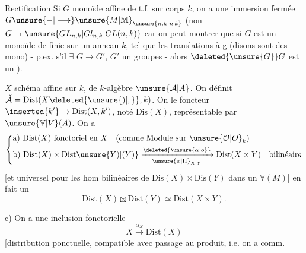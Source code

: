 \uline{Rectification} \quad Si $G$ monoïde affine de t.f. sur corps $k$, on a une immersion fermée  $G\unsure{\mathbin{-}|\longrightarrow}\unsure{M|\mathbb M}_{\unsure{n,k|n\,k}}$ (non $G\to\unsure{GL_{n,k}|Gl_{n,k}|GL(n,k)}$\unsure{)} car on peut montrer que si $G$ est un monoïde de  finie sur un anneau $k$, tel que les translations à g (disons sont des mono) - p.ex. s'il $\exists$  $G\longrightarrow G'$, $G'$ un  groupes - alors $\deleted{\unsure{G}}G$ est un ).


 $X$ schéma affine sur $k$,  de $k$-algèbre $\unsure{\mathcal A|A}$. On définit $\check{\mathcal A}=\mathrm{Dist}(X\deleted{\unsure{)|,}},k)$. On  le foncteur $\inserted{k'}\rightarrow\mathrm{Dist}(X,k')$, noté $\mathrm{Dis}(X)$, représentable par $\unsure{\mathbb V|V}(A)$. On a
\reversemarginpar{}\normalmarginpar
\[
\left\{\begin{aligned}
&\text{a)}\ \mathrm{Dist}(X)\ \text{fonctoriel en }X\quad
  (\text{comme Module sur }\unsure{\mathcal O|O}_k)\\
&\text{b)}\ \mathrm{Dist}(X)\times\mathrm{Dist}\unsure{Y)|(Y)}
  \xrightarrow[\unsure{\pi|\Pi}_{X,Y}]{\deleted{\unsure{\alpha|o}}}
  \mathrm{Dist}(X\times Y)\quad\text{bilinéaire}
\end{aligned}\right.
\]
[et universel pour les hom bilinéaires de $\mathrm{Dis}(X)\times\mathrm{Dis}(Y)$ dans un $\mathbb V(M)$]  en fait un 
\[
\mathrm{Dist}(X)\boxtimes\mathrm{Dist}(Y)\simeq\mathrm{Dist}(X\times Y).
\]

c) On a une inclusion fonctorielle
\[
X\xrightarrow{\alpha_X}\mathrm{Dist}(X)
\]
[distribution ponctuelle, compatible avec passage au produit, i.e. on a comm. 

